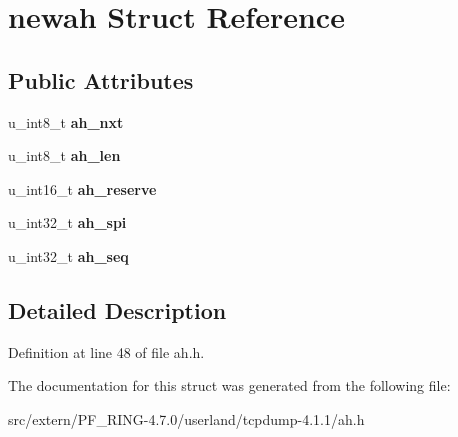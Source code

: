 \hypertarget{structnewah}{
\section{newah Struct Reference}
\label{structnewah}
}
\subsection*{Public Attributes}
\begin{DoxyCompactItemize}
\item 
\hypertarget{structnewah_af28b61f58c9df048371f4011f9bb8994}{
u\_\-int8\_\-t {\bfseries ah\_\-nxt}}
\label{structnewah_af28b61f58c9df048371f4011f9bb8994}

\item 
\hypertarget{structnewah_a0da274513de390275337205902aabfb1}{
u\_\-int8\_\-t {\bfseries ah\_\-len}}
\label{structnewah_a0da274513de390275337205902aabfb1}

\item 
\hypertarget{structnewah_a1bb51e6cc33438c43dbb1f2275d40fe6}{
u\_\-int16\_\-t {\bfseries ah\_\-reserve}}
\label{structnewah_a1bb51e6cc33438c43dbb1f2275d40fe6}

\item 
\hypertarget{structnewah_a89a6d066d5afe4b24e93105fe49c60e2}{
u\_\-int32\_\-t {\bfseries ah\_\-spi}}
\label{structnewah_a89a6d066d5afe4b24e93105fe49c60e2}

\item 
\hypertarget{structnewah_a01aff4e3f610d35398f2f7daa8f3965e}{
u\_\-int32\_\-t {\bfseries ah\_\-seq}}
\label{structnewah_a01aff4e3f610d35398f2f7daa8f3965e}

\end{DoxyCompactItemize}


\subsection{Detailed Description}


Definition at line 48 of file ah.h.



The documentation for this struct was generated from the following file:\begin{DoxyCompactItemize}
\item 
src/extern/PF\_\-RING-\/4.7.0/userland/tcpdump-\/4.1.1/ah.h\end{DoxyCompactItemize}
